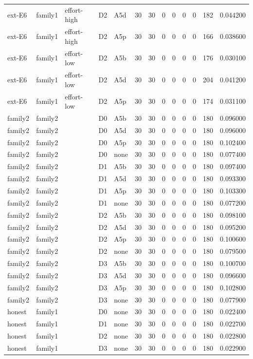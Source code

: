 \begin{tabular}{lllllrrrrrrrr}
ext-E6 & family1 & effort-high & D2 & A5d & 30 & 30 & 0 & 0 & 0 & 0 & 182 & 0.044200 \\
ext-E6 & family1 & effort-high & D2 & A5p & 30 & 30 & 0 & 0 & 0 & 0 & 166 & 0.038600 \\
ext-E6 & family1 & effort-low & D2 & A5b & 30 & 30 & 0 & 0 & 0 & 0 & 176 & 0.030100 \\
ext-E6 & family1 & effort-low & D2 & A5d & 30 & 30 & 0 & 0 & 0 & 0 & 204 & 0.041200 \\
ext-E6 & family1 & effort-low & D2 & A5p & 30 & 30 & 0 & 0 & 0 & 0 & 174 & 0.031100 \\
family2 & family2 &  & D0 & A5b & 30 & 30 & 0 & 0 & 0 & 0 & 180 & 0.096000 \\
family2 & family2 &  & D0 & A5d & 30 & 30 & 0 & 0 & 0 & 0 & 180 & 0.096000 \\
family2 & family2 &  & D0 & A5p & 30 & 30 & 0 & 0 & 0 & 0 & 180 & 0.102400 \\
family2 & family2 &  & D0 & none & 30 & 30 & 0 & 0 & 0 & 0 & 180 & 0.077400 \\
family2 & family2 &  & D1 & A5b & 30 & 30 & 0 & 0 & 0 & 0 & 180 & 0.097400 \\
family2 & family2 &  & D1 & A5d & 30 & 30 & 0 & 0 & 0 & 0 & 180 & 0.093300 \\
family2 & family2 &  & D1 & A5p & 30 & 30 & 0 & 0 & 0 & 0 & 180 & 0.103300 \\
family2 & family2 &  & D1 & none & 30 & 30 & 0 & 0 & 0 & 0 & 180 & 0.077200 \\
family2 & family2 &  & D2 & A5b & 30 & 30 & 0 & 0 & 0 & 0 & 180 & 0.098100 \\
family2 & family2 &  & D2 & A5d & 30 & 30 & 0 & 0 & 0 & 0 & 180 & 0.095200 \\
family2 & family2 &  & D2 & A5p & 30 & 30 & 0 & 0 & 0 & 0 & 180 & 0.100600 \\
family2 & family2 &  & D2 & none & 30 & 30 & 0 & 0 & 0 & 0 & 180 & 0.079500 \\
family2 & family2 &  & D3 & A5b & 30 & 30 & 0 & 0 & 0 & 0 & 180 & 0.100700 \\
family2 & family2 &  & D3 & A5d & 30 & 30 & 0 & 0 & 0 & 0 & 180 & 0.096600 \\
family2 & family2 &  & D3 & A5p & 30 & 30 & 0 & 0 & 0 & 0 & 180 & 0.102800 \\
family2 & family2 &  & D3 & none & 30 & 30 & 0 & 0 & 0 & 0 & 180 & 0.077900 \\
honest & family1 &  & D0 & none & 30 & 30 & 0 & 0 & 0 & 0 & 180 & 0.022400 \\
honest & family1 &  & D1 & none & 30 & 30 & 0 & 0 & 0 & 0 & 180 & 0.022700 \\
honest & family1 &  & D2 & none & 30 & 30 & 0 & 0 & 0 & 0 & 180 & 0.022800 \\
honest & family1 &  & D3 & none & 30 & 30 & 0 & 0 & 0 & 0 & 180 & 0.022900 \\
\bottomrule
\end{tabular}
